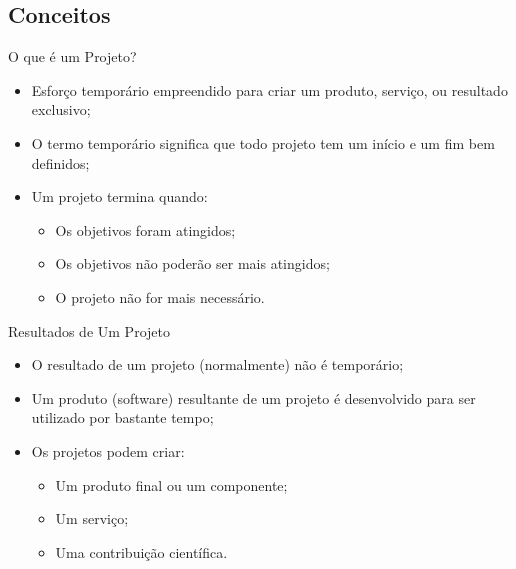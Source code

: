 \documentclass[xcolor=x11names,compress]{beamer}
\begin{document}
\subsection{Conceitos}
\begin{frame}{O que é um Projeto?}

\begin{itemize}
\itemsep 5mm

\item Esforço temporário empreendido para criar um produto, serviço, ou resultado exclusivo;

\item O termo temporário significa que todo projeto tem um início e um fim bem definidos;

\item Um projeto termina quando:
\begin{itemize}
\itemsep 3mm
\item Os objetivos foram atingidos;

\item Os objetivos não poderão ser mais atingidos;

\item O projeto não for mais necessário.

\end{itemize}
\end{itemize}
\end{frame}

\begin{frame}[allowframebreaks=.5]{Resultados de Um Projeto}

\begin{itemize}
\itemsep 5mm

\item O resultado de um projeto (normalmente) não é temporário;

\item Um produto (software) resultante de um projeto é desenvolvido para ser utilizado por bastante tempo;

\item Os projetos podem criar:
\begin{itemize}
\itemsep 3mm

\item Um produto final ou um componente;

\item Um serviço;

\item Uma contribuição científica.

\end{itemize}

\end{itemize}

\end{frame}
\end{document}
